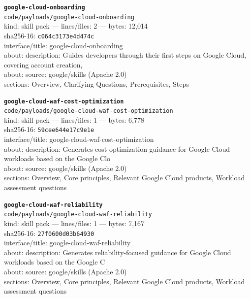 \noindent\textbf{\texttt{google-cloud-onboarding}}\\
\texttt{code/payloads/google-cloud-onboarding}\\
kind: skill pack --- lines/files: 2 --- bytes: 12,014\\
sha256-16: \texttt{c064c3173e4d474c}\\
interface/title: google-cloud-onboarding\\
about: description: Guides developers through their first steps on Google Cloud, covering account creation,\\
about: source: google/skills (Apache 2.0)\\
sections: Overview, Clarifying Questions, Prerequisites, Steps\\
\vspace*{6.0pt}
\newpage

\noindent\textbf{\texttt{google-cloud-waf-cost-optimization}}\\
\texttt{code/payloads/google-cloud-waf-cost-optimization}\\
kind: skill pack --- lines/files: 1 --- bytes: 6,778\\
sha256-16: \texttt{59cee644e17c9e1e}\\
interface/title: google-cloud-waf-cost-optimization\\
about: description: Generates cost optimization guidance for Google Cloud workloads based on the Google Clo\\
about: source: google/skills (Apache 2.0)\\
sections: Overview, Core principles, Relevant Google Cloud products, Workload assessment questions\\
\vspace*{6.0pt}

\noindent\textbf{\texttt{google-cloud-waf-reliability}}\\
\texttt{code/payloads/google-cloud-waf-reliability}\\
kind: skill pack --- lines/files: 1 --- bytes: 7,167\\
sha256-16: \texttt{27f0600d03b64930}\\
interface/title: google-cloud-waf-reliability\\
about: description: Generates reliability-focused guidance for Google Cloud workloads based on the Google C\\
about: source: google/skills (Apache 2.0)\\
sections: Overview, Core principles, Relevant Google Cloud products, Workload assessment questions\\
\vspace*{6.0pt}

